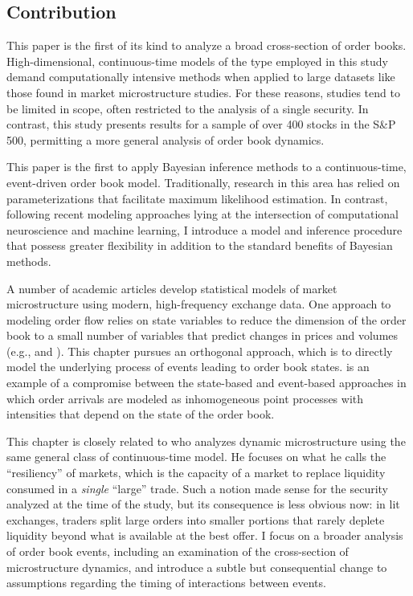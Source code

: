 	\subsection{Contribution}
		This paper is the first of its kind to analyze a broad cross-section of order books. High-dimensional, continuous-time models of the type employed in this study demand computationally intensive methods when applied to large datasets like those found in market microstructure studies. For these reasons, studies tend to be limited in scope, often restricted to the analysis of a single security. In contrast, this study presents results for a sample of over 400 stocks in the S\&P 500, permitting a more general analysis of order book dynamics.

		This paper is the first to apply Bayesian inference methods to a continuous-time, event-driven order book model. Traditionally, research in this area has relied on parameterizations that facilitate maximum likelihood estimation. In contrast, following recent modeling approaches lying at the intersection of computational neuroscience and machine learning, I introduce a model and inference procedure that possess greater flexibility in addition to the standard benefits of Bayesian methods.

		A number of academic articles develop statistical models of market microstructure using modern, high-frequency exchange data. One approach to modeling order flow relies on state variables to reduce the dimension of the order book to a small number of variables that predict changes in prices and volumes (e.g., \cite{Avellaneda2011} and \cite{Cont2013B}). This chapter pursues an orthogonal approach, which is to directly model the underlying process of events leading to order book states. \cite{Huang2015} is an example of a compromise between the state-based and event-based approaches in which order arrivals are modeled as inhomogeneous point processes with intensities that depend on the state of the order book.

		This chapter is closely related to \cite{Large2007} who analyzes dynamic microstructure using the same general class of continuous-time model. He focuses on what he calls the ``resiliency'' of markets, which is the capacity of a market to replace liquidity consumed in a \textit{single} ``large'' trade. Such a notion made sense for the security analyzed at the time of the study, but its consequence is less obvious now: in lit exchanges, traders split large orders into smaller portions that rarely deplete liquidity beyond what is available at the best offer. I focus on a broader analysis of order book events, including an examination of the cross-section of microstructure dynamics, and introduce a subtle but consequential change to assumptions regarding the timing of interactions between events.

